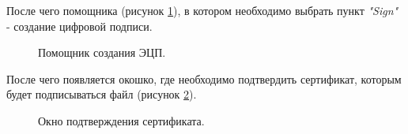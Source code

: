 \documentclass[10pt,a4paper]{report}
\begin{document}
После чего помощника (рисунок \ref{ris:step32}), в котором необходимо выбрать пункт \textit{"Sign"} - создание цифровой подписи.

\begin{figure}[h]
	\caption{Помощник создания ЭЦП.}
	\label{ris:step32}
\end{figure}

После чего появляется окошко, где необходимо подтвердить сертификат, которым будет подписываться файл (рисунок \ref{ris:step33}).

\begin{figure}[h]
	\caption{Окно подтверждения сертификата.}
	\label{ris:step33}
\end{figure}
\end{document}
